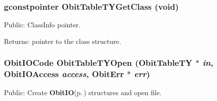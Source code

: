 \subsubsection{\setlength{\rightskip}{0pt plus 5cm}gconstpointer Obit\-Table\-TYGet\-Class (void)}\label{ObitTableTY_8h_a13}


Public: Class\-Info pointer. 

\begin{Desc}
\item[Returns:]pointer to the class structure. \end{Desc}
\subsubsection{\setlength{\rightskip}{0pt plus 5cm}Obit\-IOCode Obit\-Table\-TYOpen ({\bf Obit\-Table\-TY} $\ast$ {\em in}, Obit\-IOAccess {\em access}, {\bf Obit\-Err} $\ast$ {\em err})}\label{ObitTableTY_8h_a17}


Public: Create {\bf Obit\-IO}{\rm (p.\,\pageref{structObitIO})} structures and open file. 

